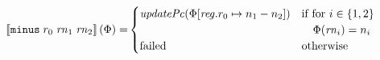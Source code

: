 \documentclass[a4paper]{article}
\begin{document}
\begin{align*}
  \sem{\tminus{r_0}{\rn_1}{\rn_2}}(\Phi) = &
                                                  \begin{cases}
                                                    \updPcAddr{\Phi\updReg{r_0}{n_1-n_2}} &
                                                    \arraycolsep=0pt
                                                    \begin{array}[t]{l}
                                                      \text{if for $i \in \{1,2\}$}\\
                                                      \quad\Phi(\rn_i) = n_i\\
                                                    \end{array}\\
                                                    \failed & \text{otherwise}
                                                  \end{cases}  
\end{align*}
\end{document}
